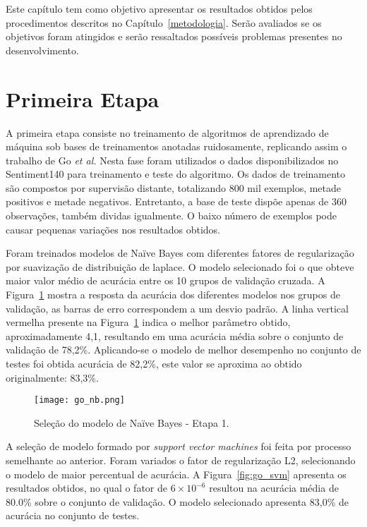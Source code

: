 Este capítulo tem como objetivo apresentar os resultados obtidos pelos procedimentos descritos no
Capítulo~\ref{metodologia}.
Serão avaliados se os objetivos foram atingidos e serão ressaltados possíveis problemas presentes no desenvolvimento.

\section{Primeira Etapa}

A primeira etapa consiste no treinamento de algoritmos de aprendizado de máquina sob bases de treinamentos anotadas
ruidosamente, replicando assim o trabalho de Go \textit{et al.}
Nesta fase foram utilizados o dados disponibilizados no Sentiment140 para treinamento e teste do algoritmo.
Os dados de treinamento são compostos por supervisão distante, totalizando 800 mil exemplos, metade positivos e metade
negativos.
Entretanto, a base de teste dispõe apenas de 360 observações, também dividas igualmente.
O baixo número de exemplos pode causar pequenas variações nos resultados obtidos.

Foram treinados modelos de Naïve Bayes com diferentes fatores de regularização por suavização de distribuição de
laplace.
O modelo selecionado foi o que obteve maior valor médio de acurácia entre os 10 grupos de validação cruzada.
A Figura~\ref{fig:go_nb} mostra a resposta da acurácia dos diferentes modelos nos grupos de validação, as barras de erro
correspondem a um desvio padrão.
A linha vertical vermelha presente na Figura~\ref{fig:go_nb} indica o melhor parâmetro obtido, aproximadamente 4,1,
resultando em uma acurácia média sobre o conjunto de validação de 78,2\%.
Aplicando-se o modelo de melhor desempenho no conjunto de testes foi obtida acurácia de 82,2\%, este valor se aproxima
ao obtido originalmente: 83,3\%.

\begin{figure}
\begin{center} {
    \begin{center}
    \texttt{[image: go\_nb.png]}
    \caption{Seleção do modelo de Naïve Bayes - Etapa 1.}
    \label{fig:go_nb}
    \end{center}
}
\end{center}
\end{figure}

A seleção de modelo formado por \textit{support vector machines} foi feita por processo semelhante ao anterior.
Foram variados o fator de regularização L2, selecionando o modelo de maior percentual de acurácia.
A Figura~\ref{fig:go_svm} apresenta os resultados obtidos, no qual o fator de $6 \times 10^{-6}$ resultou na acurácia
média de 80.0\% sobre o conjunto de validação.
O modelo selecionado apresenta 83,0\% de acurácia no conjunto de testes.

